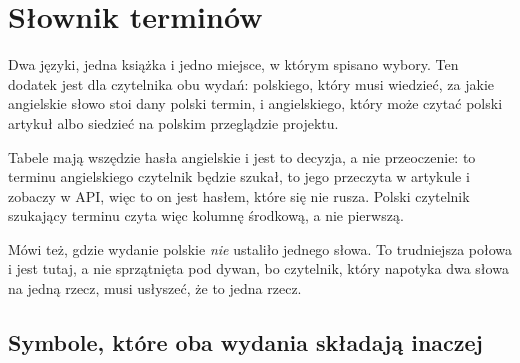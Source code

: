 %
%
%

\chapter{Słownik terminów}
\label{app:D}

\noindent
Dwa języki, jedna książka i jedno miejsce, w którym spisano wybory. Ten dodatek
jest dla czytelnika obu wydań: polskiego, który musi wiedzieć, za jakie
angielskie słowo stoi dany polski termin, i angielskiego, który może czytać
polski artykuł albo siedzieć na polskim przeglądzie projektu.

Tabele mają wszędzie hasła angielskie i jest to decyzja, a nie przeoczenie: to
terminu angielskiego czytelnik będzie szukał, to jego przeczyta w artykule i
zobaczy w API, więc to on jest hasłem, które się nie rusza. Polski czytelnik
szukający terminu czyta więc kolumnę środkową, a nie pierwszą.

Mówi też, gdzie wydanie polskie \emph{nie} ustaliło jednego słowa. To trudniejsza
połowa i jest tutaj, a nie sprzątnięta pod dywan, bo czytelnik, który napotyka
dwa słowa na jedną rzecz, musi usłyszeć, że to jedna rzecz.

\section{Symbole, które oba wydania składają inaczej}
\label{sec:D-notation}

